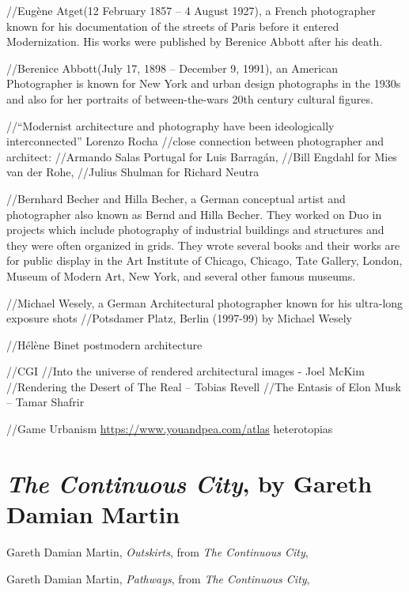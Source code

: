 \documentclass[
  openany]{book}
\begin{document}
//Eugène Atget(12 February 1857 -- 4 August 1927), a French photographer known for his documentation of the streets of Paris before it entered Modernization. His works were published by Berenice Abbott after his death.

//Berenice Abbott(July 17, 1898 -- December 9, 1991), an American Photographer is known for New York and urban design photographs in the 1930s and also for her portraits of between-the-wars 20th century cultural figures.

//``Modernist architecture and photography have been ideologically interconnected'' Lorenzo Rocha
//close connection between photographer and architect:
//Armando Salas Portugal for Luis Barragán,
//Bill Engdahl for Mies van der Rohe,
//Julius Shulman for Richard Neutra

//Bernhard Becher and Hilla Becher, a German conceptual artist and photographer also known as Bernd and Hilla Becher. They worked on Duo in projects which include photography of industrial buildings and structures and they were often organized in grids. They wrote several books and their works are for public display in the Art Institute of Chicago, Chicago, Tate Gallery, London, Museum of Modern Art, New York, and several other famous museums.

//Michael Wesely, a German Architectural photographer known for his ultra-long exposure shots //Potsdamer Platz, Berlin (1997-99) by Michael Wesely

//Hélène Binet postmodern architecture

//CGI
//Into the universe of rendered architectural images - Joel McKim
//Rendering the Desert of The Real -- Tobias Revell
//The Entasis of Elon Musk -- Tamar Shafrir

//Game Urbanism
\url{https://www.youandpea.com/atlas}
heterotopias

\hypertarget{the-continuous-city-by-gareth-damian-martin}{%
\section*{\texorpdfstring{\emph{The Continuous City}, by Gareth Damian Martin}{The Continuous City, by Gareth Damian Martin}}\label{the-continuous-city-by-gareth-damian-martin}}

Gareth Damian Martin, \emph{Outskirts}, from \emph{The Continuous City},

Gareth Damian Martin, \emph{Pathways}, from \emph{The Continuous City},
\end{document}
